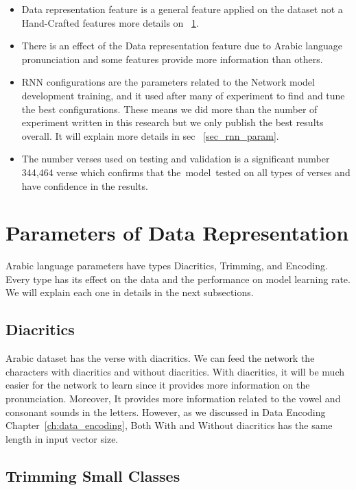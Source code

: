 \begin{itemize}
	\item Data representation feature is a general feature applied on the dataset not a Hand-Crafted features more details on ~\ref{sec_data_rep_param}.
	\item There is an effect of the Data representation feature due to Arabic language pronunciation and some features provide more information than others.
	\item RNN configurations are the parameters related to the Network model development training, and it used after many of experiment to find and tune the best configurations. These means we did more than the number of experiment written in this research but we only publish the best results overall. It will explain more details in sec ~\ref{sec_rnn_param}.
	\item The number verses used on testing and validation is a significant number 344,464 verse which confirms that the model tested on all types of verses and have confidence in the results.

\end{itemize}

\section{Parameters of Data Representation}\label{sec_data_rep_param}

Arabic language parameters have types Diacritics, Trimming, and Encoding. Every type has its effect on the data and the performance on model learning rate. We will explain each one in details in the next subsections.

\subsection{Diacritics}

Arabic dataset has the verse with diacritics. We can feed the network the characters with diacritics and without diacritics. With diacritics, it will be much easier for the network to learn since it provides more information on the pronunciation. Moreover, It provides more information related to the vowel and consonant sounds in the letters. However, as we discussed in Data Encoding Chapter~\ref{ch:data_encoding}, Both With and Without diacritics has the same length in input vector size.

\subsection{Trimming Small Classes}

